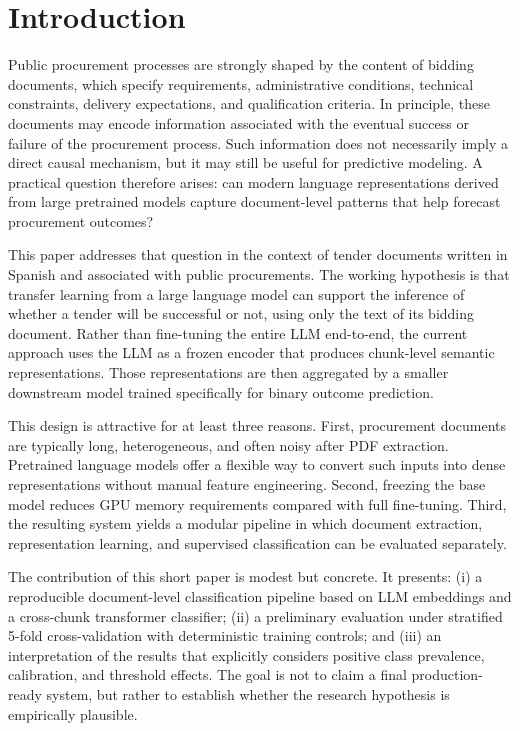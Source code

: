 \documentclass[conference]{IEEEtran}
\begin{document}
\section{Introduction}
Public procurement processes are strongly shaped by the content of bidding documents, which specify requirements, administrative conditions, technical constraints, delivery expectations, and qualification criteria. In principle, these documents may encode information associated with the eventual success or failure of the procurement process. Such information does not necessarily imply a direct causal mechanism, but it may still be useful for predictive modeling. A practical question therefore arises: can modern language representations derived from large pretrained models capture document-level patterns that help forecast procurement outcomes?

This paper addresses that question in the context of tender documents written in Spanish and associated with public procurements. The working hypothesis is that transfer learning from a large language model can support the inference of whether a tender will be successful or not, using only the text of its bidding document. Rather than fine-tuning the entire LLM end-to-end, the current approach uses the LLM as a frozen encoder that produces chunk-level semantic representations. Those representations are then aggregated by a smaller downstream model trained specifically for binary outcome prediction.

This design is attractive for at least three reasons. First, procurement documents are typically long, heterogeneous, and often noisy after PDF extraction. Pretrained language models offer a flexible way to convert such inputs into dense representations without manual feature engineering. Second, freezing the base model reduces GPU memory requirements compared with full fine-tuning. Third, the resulting system yields a modular pipeline in which document extraction, representation learning, and supervised classification can be evaluated separately.

The contribution of this short paper is modest but concrete. It presents: (i) a reproducible document-level classification pipeline based on LLM embeddings and a cross-chunk transformer classifier; (ii) a preliminary evaluation under stratified 5-fold cross-validation with deterministic training controls; and (iii) an interpretation of the results that explicitly considers positive class prevalence, calibration, and threshold effects. The goal is not to claim a final production-ready system, but rather to establish whether the research hypothesis is empirically plausible.
\end{document}
